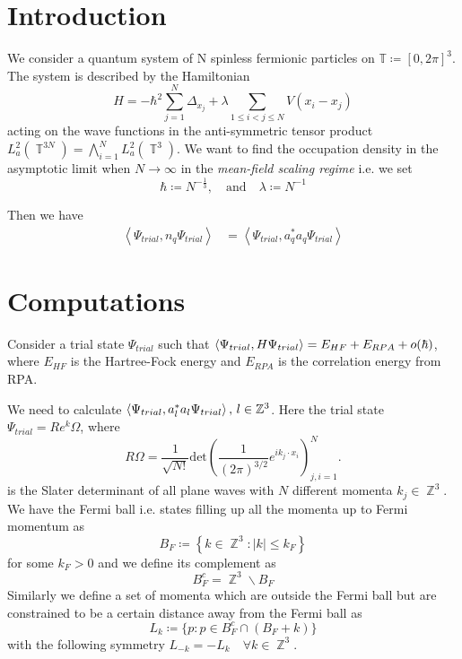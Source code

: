\documentclass[sn-mathphys,Numbered, a4paper ,nocrop]{sn-jnl}%
\DeclareMathOperator{\Z}{\mathbb{Z}}
\DeclareMathOperator{\T}{\mathbb{T}}
\newcommand{\eva}[1]{\left\langle #1 \right\rangle}
\theoremstyle{plain}
\theoremstyle{definition}
\theoremstyle{remark}
\theoremstyle{plain}
\theoremstyle{definition}
\theoremstyle{remark}
\begin{document}
\section{Introduction}\label{sec1}
We consider a quantum system of N spinless fermionic particles on $\mathbb{T}\coloneq [0,2\pi]^3$. The system is described by the Hamiltonian
\begin{equation}
    H = -\hbar^2\sum\limits_{j=1}^{N}\Delta_{x_j} + \lambda\!\!\!\sum\limits_{1\leq i < j \leq N } V(x_i - x_j)
\end{equation}
acting on the wave functions in the anti-symmetric tensor product $L^2_a(\T^{3N}) = \bigwedge_{i=1}^N L^2_a(\T^3)$.
We want to find the occupation density in the asymptotic limit when $N\rightarrow\infty$ in the \textit{mean-field scaling regime} i.e. we set
\begin{equation}
    \hbar\coloneq N^{-\frac{1}{3}}, \quad\text{and}\quad \lambda \coloneq N^{-1}
\end{equation}



Then we have
\begin{align}
    \eva{\Psi_{trial},n_q\Psi_{trial}} &= \eva{\Psi_{trial},a^*_qa_q\Psi_{trial}} 
\end{align}

\section{Computations}\label{sec2}

Consider a trial state $\Psi_{trial}$ such that $\braket{\Psi_{trial},H\Psi_{trial}} = E_{HF} + E_{RPA}+ o(\hbar) $, where $E_{HF}$ is the Hartree-Fock energy and $E_{RPA}$ is the correlation energy from RPA.

We need to calculate $\braket{\Psi_{trial},a^*_la_l\Psi_{trial}},\, l\in\mathbb{Z}^3$. Here the trial state $\Psi_{trial}= Re^k\Omega$, where 
\begin{equation}
    R\Omega = \frac{1}{\sqrt{N!}}\text{det}\left(\frac{1}{(2\pi)^{3/2}}e^{ik_j\cdot x_i}\right)^N_{j,i=1}.
\end{equation}
is the Slater determinant of all plane waves with $N$ different momenta $k_j \in \Z^3$.
We have the Fermi ball i.e. states filling up all the momenta up to Fermi momentum as
\begin{equation}
    B_F\coloneq\left\{k\in \Z^3 : |k|\leq k_F\right\}
\end{equation}
for some $k_F>0$ and we define its complement as 
\begin{equation}
    B_F^c=\Z^3\backslash B_F
\end{equation}
Similarly we define a set of momenta which are outside the Fermi ball but are constrained to be a certain distance away from the Fermi ball as 
\begin{equation}
    L_k\coloneq \{p :p\in B_F^c \cap (B_F + k)\}
\end{equation}
with the following symmetry $L_{-k}=-L_k \quad\forall k \in \Z^3$.
\end{document}
